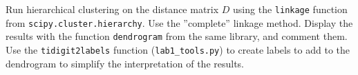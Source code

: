 \documentclass{nada-ten}
\begin{document}
Run hierarchical clustering on the distance matrix $D$ using the \texttt{linkage} function from
\texttt{scipy.cluster.hierarchy}. Use the ''complete'' linkage method. Display the results with the function \texttt{dendrogram} from the same library, and comment them. Use the \texttt{tidigit2labels} function (\texttt{lab1\_tools.py}) to create labels to add to the dendrogram to simplify the interpretation of the results.




\end{document}
